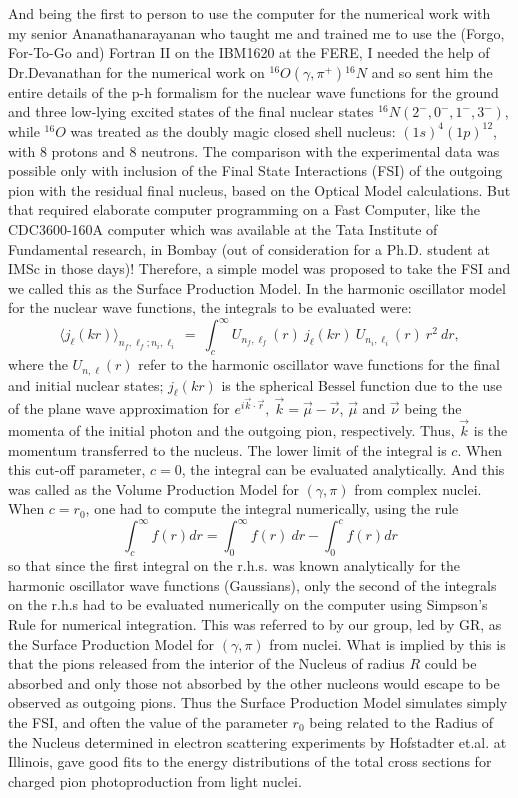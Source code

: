 And being the first to person to use the computer for the numerical work with my senior Ananathanarayanan who taught me and trained me to use the (Forgo, For-To-Go and) Fortran II on the IBM1620 at the FERE, I needed the help of Dr.Devanathan for the numerical work on ${}^{16}O(\gamma, \pi^+){}^{16}N$ and so sent him the entire details of the p-h formalism for the nuclear wave functions for the ground and three low-lying excited states of the final nuclear states $^{16}N(2^-,0^-,1^-,3^-)$, while $^{16}O$ was treated as the doubly magic closed shell nucleus: $(1s)^4(1p)^{12}$, with 8 protons and 8 neutrons. The comparison with the experimental data was possible only with inclusion of the Final State Interactions (FSI) of the outgoing pion with the residual final nucleus, based on the Optical Model calculations. But that required elaborate computer programming on a Fast Computer, like the CDC3600-160A computer which was available at the Tata Institute of Fundamental research, in Bombay (out of consideration for a Ph.D. student at IMSc in those days)! Therefore, a simple model was proposed to take the FSI and we called this as the Surface Production Model. In the harmonic oscillator model for the nuclear wave functions, the integrals to be evaluated were:
$$
\langle j_\ell(kr)\rangle_{n_f,\ell_f;n_i,\ell_i}\ =\  \int_c^\infty U_{n_f,\ell_f}(r)
\ j_{\ell}(kr)\ U_{n_i,\ell_i}(r)\ r^2\ dr,
$$
where the $U_{n,\ell}(r)$ refer to the harmonic oscillator wave functions for the final and initial nuclear states; $j_\ell(kr)$ is the spherical Bessel function due to the use of the plane wave approximation for $e^{i\vec{k}\cdot \vec{r}},\  \vec{k}=\vec{\mu}-\vec{\nu}$, $\vec{\mu}$ and $\vec{\nu}$ being the momenta of the initial photon and the outgoing pion, respectively. Thus, $\vec{k}$ is the momentum transferred to the nucleus. The lower limit of the integral is $c$. When this cut-off parameter, $c=0$, the integral can be evaluated analytically. And this was called as the Volume Production Model for $(\gamma,\pi)$ from complex nuclei. When $c=r_0$, one had to compute the integral numerically, using the rule
$$
\int_c^\infty f(r) dr = \int_0^\infty f(r)\ dr - \int_0^c f(r) dr
$$
so that since the first integral on the r.h.s. was known analytically for the harmonic oscillator wave functions (Gaussians), only the second of the integrals on the r.h.s had to be evaluated numerically on the computer using Simpson's Rule for numerical integration. This was referred to by our group, led by GR, as the Surface Production Model for $(\gamma,\pi)$ from nuclei. What is implied by this is that the pions released from the interior of the Nucleus of radius $R$ could be absorbed and only those not absorbed by the other nucleons would escape to be observed as outgoing pions. Thus the Surface Production Model simulates simply the FSI, and often the value of the parameter $r_0$ being related to the Radius of the Nucleus determined in electron scattering experiments by Hofstadter et.al. at Illinois, gave good fits to the energy distributions of the total cross sections for charged pion photoproduction from light nuclei.


